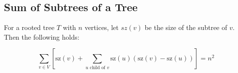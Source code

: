 \subsection{Sum of Subtrees of a Tree}

For a rooted tree $T$ with $n$ vertices, let $sz(v)$ be the size of the subtree of $v$. Then the following holds:

\[ \sum_{v \in V} \left[\text{sz}(v) + \sum_{u \text{ child of } v} \text{sz}(u)(\text{sz}(v) - \text{sz}(u))\right] = n^2 \]
